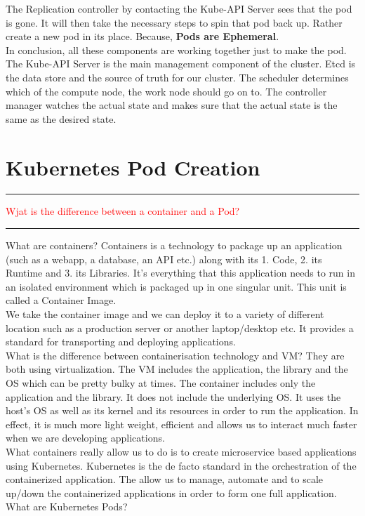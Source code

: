 \documentclass{article}
\begin{document}
The Replication controller by contacting the Kube-API Server sees that the pod is gone. It will then take the necessary steps to spin that pod back up. Rather create a new pod in its place. Because, \textbf{Pods are Ephemeral}. \\
In conclusion, all these components are working together just to make the pod. The Kube-API Server is the main management component of the cluster. Etcd is the data store and the source of truth for our cluster. The scheduler determines which of the compute node, the work node should go on to. The controller manager watches the actual state and makes sure that the actual state is the same as the desired state. 

\newpage
\section{Kubernetes Pod Creation}
\noindent
{\color{red} \rule{\linewidth}{0.5mm}}
\textcolor{red}{Wjat is the difference between a container and a Pod?} \\
\noindent
{\color{red} \rule{\linewidth}{0.5mm}}
What are containers? Containers is a technology to package up an application (such as a webapp, a database, an API etc.) along with its 1. Code, 2. its Runtime and 3. its Libraries. It's everything that this application needs to run in an isolated environment which is packaged up in one singular unit. This unit is called a Container Image. \\
We take the container image and we can deploy it to a variety of different location such as a production server or another laptop/desktop etc.  It provides a standard for transporting and deploying applications. \\
What is the difference between containerisation technology and VM? They are both using virtualization. The VM includes the application, the library and the OS which can be pretty bulky at times. The container includes only the application and the library. It does not include the underlying OS. It uses the host's OS as well as its kernel and its resources in order to run the application. In effect, it is much more light weight, efficient and allows us to interact much faster when we are developing applications. \\
What containers really allow us to do is to create microservice based applications using Kubernetes. Kubernetes is the de facto standard in the orchestration of the containerized application. The allow us to manage, automate and to scale up/down the containerized applications in order to form one full application. \\
What are Kubernetes Pods?
\end{document}
